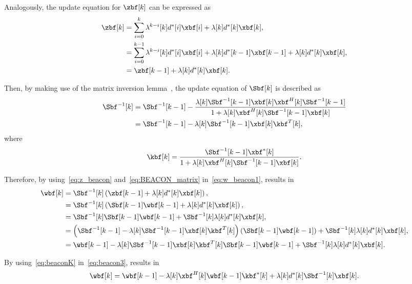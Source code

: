 Analogously, the update equation for $\zbf[k]$ can be expressed as
\begin{align}
	\zbf[k] &= \sum_{i = 0}^k \lambda^{k-i}[k]d^*[i]\xbf[i] + \lambda[k]d^*[k]\xbf[k], \nonumber\\
	&=  \sum_{i = 0}^{k-1} \lambda^{k-i}[k]d^*[i]\xbf[i] + \lambda[k]d^*[k-1]\xbf[k-1] + \lambda[k]d^*[k]\xbf[k], \nonumber\\
	&= \zbf[k-1] + \lambda[k]d^*[k]\xbf[k].\label{eq:z_beacon}
\end{align}

Then, by making use of the matrix inversion lemma~\cite{goodwin1977dynamic}, the update equation of $\Sbf[k]$ is described as
\begin{align}
	\Sbf^{-1}[k] &= \Sbf^{-1}[k-1] - \frac{\lambda[k]\Sbf^{-1}[k-1]\xbf[k]\xbf^H[k] \Sbf^{-1}[k-1]}{1 + \lambda[k]\xbf^H[k]\Sbf^{-1}[k-1]\xbf[k]} \label{eq:BEACON_matrix2} \\
	&= \Sbf^{-1}[k-1] - \lambda[k]\Sbf^{-1}[k-1] \xbf[k] \kbf^T[k],\label{eq:BEACON_matrix}
\end{align}
where
\begin{align}\label{eq:beaconK}
	\kbf[k] = \frac{\Sbf^{-1}[k-1]\xbf^*[k]}{1 + \lambda[k]\xbf^H[k]\Sbf^{-1}[k-1]\xbf[k]}.
\end{align}

Therefore, by using~\eqref{eq:z_beacon} and~\eqref{eq:BEACON_matrix} in~\eqref{eq:w_beacon1}, results in
\begin{align}
	\wbf[k] &= \Sbf^{-1}[k]\left(\zbf[k-1] + \lambda[k]d^*[k]\xbf[k]\right), \nonumber \\
	&= \Sbf^{-1}[k]\left( \Sbf[k-1]\wbf[k-1] + \lambda[k]d^*[k]\xbf[k]\right), \nonumber \\
	&= \Sbf^{-1}[k]\Sbf[k-1]\wbf[k-1] + \Sbf^{-1}[k]\lambda[k]d^*[k]\xbf[k] ,\nonumber \\
	&= \left(\Sbf^{-1}[k-1] - \lambda[k]\Sbf^{-1}[k-1] \xbf[k] \kbf^T[k]\right) \left( \Sbf[k-1]\wbf[k-1]\right) + \Sbf^{-1}[k]\lambda[k]d^*[k]\xbf[k],\nonumber\\
	&= \wbf[k-1] - \lambda[k]\Sbf^{-1}[k-1]\xbf[k] \kbf^T[k]\Sbf[k-1]\wbf[k-1] + \Sbf^{-1}[k]\lambda[k]d^*[k]\xbf[k].\label{eq:beacon3}
\end{align}

By using~\eqref{eq:beaconK} in~\eqref{eq:beacon3}, results in
\begin{align}
	\wbf[k] = \wbf[k-1] - \lambda[k]\xbf^H[k] \wbf[k-1]\kbf^*[k] + \lambda[k]d^*[k]\Sbf^{-1}[k]\xbf[k].
\end{align}

